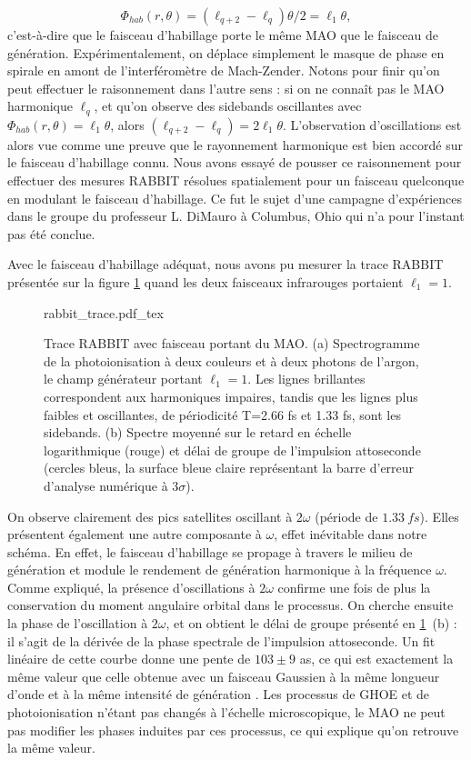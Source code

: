 \begin{equation*}
{\Phi }_{hab}(r,\theta )=\left(\ell_{q+2}-\ell_q\right)\theta/2=\ell_1\theta,
\end{equation*}
c'est-à-dire que le faisceau d'habillage porte le même MAO que le faisceau de génération. Expérimentalement, on déplace simplement le masque de phase en spirale en amont de l'interféromètre de Mach-Zender. Notons pour finir qu'on peut effectuer le raisonnement dans l'autre sens : si on ne connaît pas le MAO harmonique $\ell_q$, et qu'on observe des sidebands oscillantes avec ${\Phi }_{hab}(r,\theta )=\ell_1\theta$, alors $\left(\ell_{q+2}-\ell_q\right)=2\ell_1\theta$. L'observation d'oscillations est alors vue comme une preuve que le rayonnement harmonique est bien accordé sur le faisceau d'habillage connu. Nous avons essayé de pousser ce raisonnement pour effectuer des mesures RABBIT résolues spatialement pour un faisceau quelconque en modulant le faisceau d'habillage. Ce fut le sujet d'une campagne d'expériences dans le groupe du professeur L. DiMauro à Columbus, Ohio qui n'a pour l'instant pas été conclue.

Avec le faisceau d'habillage adéquat, nous avons pu mesurer la trace RABBIT présentée sur la figure \ref{Fig:omabbit} quand les deux faisceaux infrarouges portaient $\ell_1=1$.

\begin{figure}[!ht]
\centering
\def\svgwidth{\columnwidth}
{rabbit_trace.pdf_tex}
\caption{Trace RABBIT avec faisceau portant du MAO. (a) Spectrogramme de la photoionisation à deux couleurs et à deux photons de l'argon, le champ générateur portant $\ell_1=1$. Les lignes brillantes correspondent aux harmoniques impaires, tandis que les lignes plus faibles et oscillantes, de périodicité T=2.66 fs et 1.33 fs, sont les sidebands. (b) Spectre moyenné sur le retard en échelle logarithmique (rouge) et délai de groupe de l'impulsion attoseconde (cercles bleus, la surface bleue claire représentant la barre d'erreur d'analyse numérique à $3\sigma$).}
\label{Fig:omabbit}
\end{figure}

On observe clairement des pics satellites oscillant à $2\omega$ (période de  $\SI{1.33}{fs}$). Elles présentent également une autre composante à $\omega$, effet inévitable dans notre schéma. En effet, le faisceau d'habillage se propage à travers le milieu de génération et module le rendement de génération harmonique à la fréquence $\omega$. Comme expliqué, la présence d'oscillations à $2\omega$ confirme une fois de plus la conservation du moment angulaire orbital dans le processus. On cherche ensuite la phase de l'oscillation à $2\omega$, et on obtient le délai de groupe présenté en \ref{Fig:omabbit}~(b) : il s'agit de la dérivée de la phase spectrale de l'impulsion attoseconde. Un fit linéaire de cette courbe donne une pente de $103\pm9$ as, ce qui est exactement la même valeur que celle obtenue avec un faisceau Gaussien à la même longueur d'onde et à la même intensité de génération . Les processus de GHOE et de photoionisation n'étant pas changés à l'échelle microscopique, le MAO ne peut pas modifier les phases induites par ces processus, ce qui explique qu'on retrouve la même valeur.

